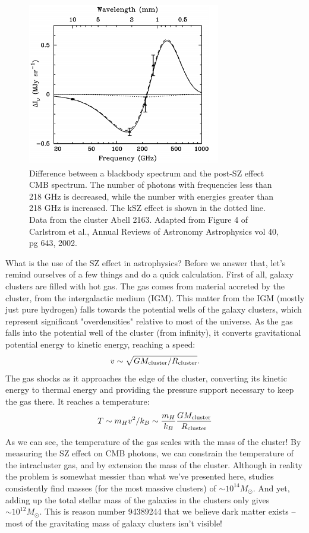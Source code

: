 \documentclass{article}
\begin{document}
\begin{figure}
    \centering
    \includegraphics[width=0.75\textwidth]{figures/CarlstromFig4.png}
    \caption{Difference between a blackbody spectrum and the post-SZ effect CMB spectrum. The number of photons with frequencies less than 218 GHz is decreased, while the number with energies greater than 218 GHz is increased. The kSZ effect is shown in the dotted line. Data from the cluster Abell 2163. Adapted from Figure 4 of Carlstrom et al., Annual Reviews of Astronomy Astrophysics vol 40, pg 643, 2002.}
    \label{fig:carlstrom4}
\end{figure}

What is the use of the SZ effect in astrophysics? Before we answer that, let's remind ourselves of a few things and do a quick calculation. First of all, galaxy clusters are filled with hot gas. The gas comes from material accreted by the cluster, from the intergalactic medium (IGM). This matter from the IGM (mostly just pure hydrogen) falls towards the potential wells of the galaxy clusters, which represent significant "overdensities" relative to most of the universe. As the gas falls into the potential well of the cluster (from infinity), it converts gravitational potential energy to kinetic energy, reaching a speed:
\begin{equation}
v \sim \sqrt{GM_{\rm cluster}/{R_{\rm cluster}}}.
\end{equation}
The gas shocks as it approaches the edge of the cluster, converting its kinetic energy to thermal energy and providing the pressure support necessary to keep the gas there. It reaches a temperature:
\begin{equation}
T \sim m_H v^2/k_B \sim \frac{m_H}{k_B}\frac{GM_{\rm cluster}}{R_{\rm cluster}}
\end{equation}
As we can see, the temperature of the gas scales with the mass of the cluster! By measuring the SZ effect on CMB photons, we can constrain the temperature of the intracluster gas, and by extension the mass of the cluster. Although in reality the problem is somewhat messier than what we've presented here, studies consistently find masses (for the most massive clusters) of $\sim 10^{14} M_{\odot}$. And yet, adding up the total stellar mass of the galaxies in the clusters only gives $\sim 10^{12} M_{\odot}$. This is reason number 94389244 that we believe dark matter exists -- most of the gravitating mass of galaxy clusters isn't visible!
\end{document}
